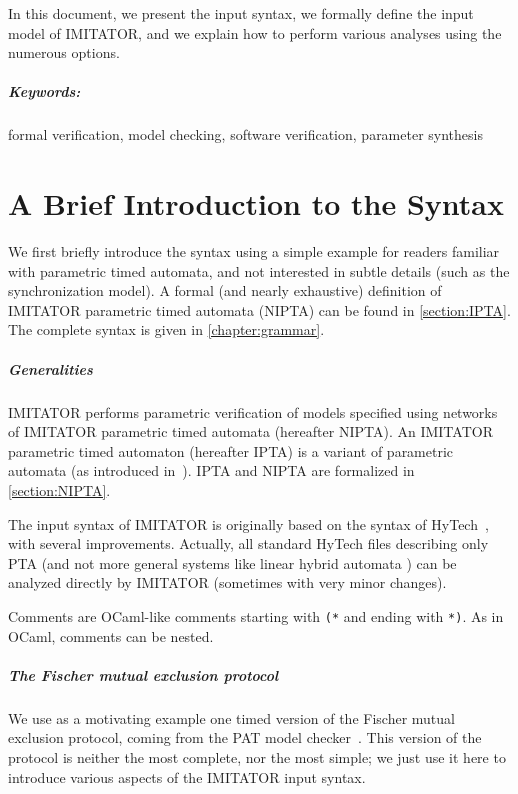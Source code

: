 \documentclass[a4paper,11pt]{report}
\newcommand{\hytech}{{\sc HyTech}}
\newcommand{\imitator}{\textsf{IMITATOR}}
\newcommand{\IPTA}{IPTA}
\newcommand{\NIPTA}{NIPTA}
\newcommand{\pat}{PAT}
\newcommand{\styleIMI}[1]{\textcolor{imicolor}{\texttt{#1}}}
\begin{document}
In this document, we present the input syntax, we formally define the input model of \imitator{}, and we explain how to perform various analyses using the numerous options.


\paragraph{Keywords:} formal verification, model checking, software verification, parameter synthesis


\chapter{A Brief Introduction to the Syntax}

We first briefly introduce the syntax using a simple example for readers familiar with parametric timed automata, and not interested in subtle details (such as the synchronization model).
A formal (and nearly exhaustive) definition of \imitator{} parametric timed automata (\NIPTA{}) can be found in \cref{section:IPTA}.
The complete syntax is given in \cref{chapter:grammar}.

\paragraph{Generalities}
\imitator{} performs parametric verification of models specified using networks of \imitator{} parametric timed automata (hereafter \NIPTA{}).
An \imitator{} parametric timed automaton (hereafter \IPTA{}) is a variant of parametric automata (as introduced in~\cite{AHV93}).
\IPTA{} and \NIPTA{} are formalized in \cref{section:NIPTA}.

The input syntax of \imitator{} is originally based on the syntax of \hytech{}~\cite{HHW95}, with several improvements.
Actually, all standard \hytech{} files describing only PTA (and not more general systems like linear hybrid automata \cite{achh92}) can be analyzed directly by \imitator{} (sometimes with very minor changes).

Comments are OCaml-like comments starting with \styleIMI{(*} and ending with \styleIMI{*)}.
As in OCaml, comments can be nested.


\paragraph{The Fischer mutual exclusion protocol}
We use as a motivating example one timed version of the Fischer mutual exclusion protocol, coming from the \pat{} model checker~\cite{SLDP09}.
This version of the protocol is neither the most complete, nor the most simple; we just use it here to introduce various aspects of the \imitator{} input syntax.
\end{document}
